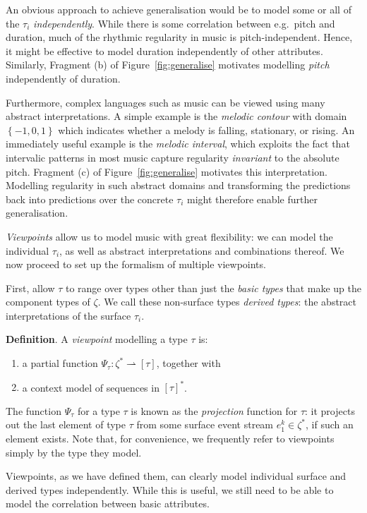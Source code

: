 \documentclass[12pt,a4paper,twoside,openright]{report}
\newcommand{\set}[1]{ \left\{ #1 \right\} }
\begin{document}
An obvious approach to achieve generalisation would be to model some or all of
the $\tau_i$ \emph{independently}. While there is some correlation between e.g.\
pitch and duration, much of the rhythmic regularity in music is
pitch-independent. Hence, it might be effective to model duration independently
of other attributes. Similarly, Fragment (b) of Figure~\ref{fig:generalise}
motivates modelling \emph{pitch} independently of duration.

Furthermore, complex languages such as music can be viewed using many abstract
interpretations. A simple example is the \emph{melodic contour} with domain
$\set{-1,0,1}$ which indicates whether a melody is falling, stationary, or
rising. An immediately useful example is the \emph{melodic interval}, which
exploits the fact that intervalic patterns in most music capture regularity
\emph{invariant} to the absolute pitch. Fragment (c) of
Figure~\ref{fig:generalise} motivates this interpretation. Modelling regularity
in such abstract domains and transforming the predictions back into predictions
over the concrete $\tau_i$ might therefore enable further generalisation.

\emph{Viewpoints} allow us to model music with great flexibility: we can model
the individual $\tau_i$, as well as abstract interpretations and combinations
thereof. We now proceed to set up the formalism of multiple viewpoints.

First, allow $\tau$ to range over types other than just the \emph{basic types}
that make up the component types of $\zeta$. We call these non-surface types
\emph{derived types}: the abstract interpretations of the surface $\tau_i$. 

\textbf{Definition}. A \emph{viewpoint} modelling a type $\tau$ is:
\begin{enumerate}[label=\arabic*., itemsep=0mm]
  \item a partial function $\Psi_\tau : \zeta^* \rightharpoonup [\tau]$,
    together with
  \item a context model of sequences in $[\tau]^*$.
\end{enumerate}

The function $\Psi_\tau$ for a type $\tau$ is known as the \emph{projection}
function for $\tau$: it projects out the last element of type $\tau$ from some
surface event stream $e_1^k \in \zeta^*$, if such an element exists. Note that,
for convenience, we frequently refer to viewpoints simply by the type they
model. 

Viewpoints, as we have defined them, can clearly model individual surface and
derived types independently. While this is useful, we still need to be able to
model the correlation between basic attributes.
\end{document}
